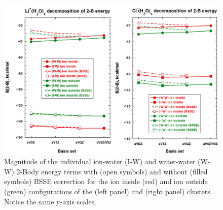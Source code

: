 \begin{figure}[h]
\uwsinglespace
\begin{center}
\includegraphics[width=\textwidth]{Figures/Chapter_3/figure_3_combined.png}
\end{center}
\caption[Magnitude of the individual ion-water (I-W) and water-water (W-W) 2-Body energy terms with (open symbols) and without (filled symbols) BSSE correction for the ion inside (red) and ion outside (green) configurations of the  (left panel) and  (right panel) clusters. Notice the same y-axis scales.]{Magnitude of the individual ion-water (I-W) and water-water (W-W) 2-Body energy terms with (open symbols) and without (filled symbols) BSSE correction for the ion inside (red) and ion outside (green) configurations of the  (left panel) and  (right panel) clusters. Notice the same y-axis scales.}
\label{fig:MBE_II_3}
\end{figure}